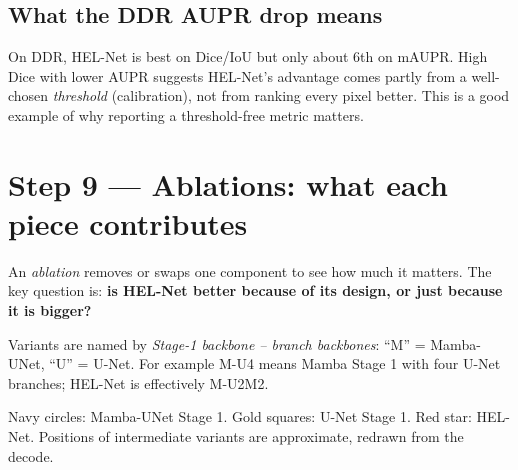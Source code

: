 \documentclass[11pt,a4paper]{article}
\begin{document}
\subsection{What the DDR AUPR drop means}
On DDR, HEL-Net is best on Dice/IoU but only about 6th on mAUPR. High Dice with lower AUPR suggests
HEL-Net's advantage comes partly from a well-chosen \emph{threshold} (calibration), not from ranking
every pixel better. This is a good example of why reporting a threshold-free metric matters.

\section{Step 9 --- Ablations: what each piece contributes}
\begin{idea}
An \emph{ablation} removes or swaps one component to see how much it matters. The key question
is: \textbf{is HEL-Net better because of its design, or just because it is bigger?}
\end{idea}

Variants are named by \emph{Stage-1 backbone -- branch backbones}: ``M'' = Mamba-UNet, ``U'' = U-Net.
For example M-U4 means Mamba Stage 1 with four U-Net branches; HEL-Net is effectively M-U2M2.

\begin{center}
\end{center}
{\small Navy circles: Mamba-UNet Stage 1. Gold squares: U-Net Stage 1. Red star: HEL-Net. Positions
of intermediate variants are approximate, redrawn from the decode.}
\end{document}

